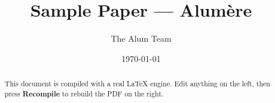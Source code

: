 \documentclass[11pt]{article}
\title{Sample Paper --- Alumère}
\author{The Alum Team}
\date{\today}
\begin{document}
\maketitle

\begin{abstract}
This document is compiled with a real LaTeX engine. Edit anything on the
left, then press \textbf{Recompile} to rebuild the PDF on the right.
\end{abstract}

\tableofcontents



\end{document}
